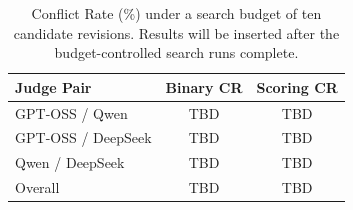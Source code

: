 \begin{table}[t]
  \centering
  \caption{Conflict Rate (\%) under a search budget of ten candidate revisions.
  Results will be inserted after the budget-controlled search runs complete.}
  \label{tab:search-budget-conflict}
  \small
  \begin{tabular}{l cc}
    \toprule
    Judge Pair & Binary CR & Scoring CR \\
    \midrule
    GPT-OSS / Qwen & TBD & TBD \\
    GPT-OSS / DeepSeek & TBD & TBD \\
    Qwen / DeepSeek & TBD & TBD \\
    \midrule
    Overall & TBD & TBD \\
    \bottomrule
  \end{tabular}
\end{table}
